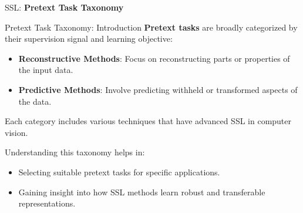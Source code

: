 \begin{frame}{}
    \LARGE SSL: \textbf{Pretext Task Taxonomy}
\end{frame}

\begin{frame}[allowframebreaks]{Pretext Task Taxonomy: Introduction}
    \textbf{Pretext tasks} are broadly categorized by their supervision signal and learning objective: 
    \begin{itemize}
        \item \textbf{Reconstructive Methods}: Focus on reconstructing parts or properties of the input data.
        \item \textbf{Predictive Methods}: Involve predicting withheld or transformed aspects of the data.
    \end{itemize}
    
    Each category includes various techniques that have advanced SSL in computer vision.
    
    Understanding this taxonomy helps in:
    \begin{itemize}
        \item Selecting suitable pretext tasks for specific applications.
        \item Gaining insight into how SSL methods learn robust and transferable representations.
    \end{itemize}
\end{frame}

% 
% 
% 
% 
% 
% 
